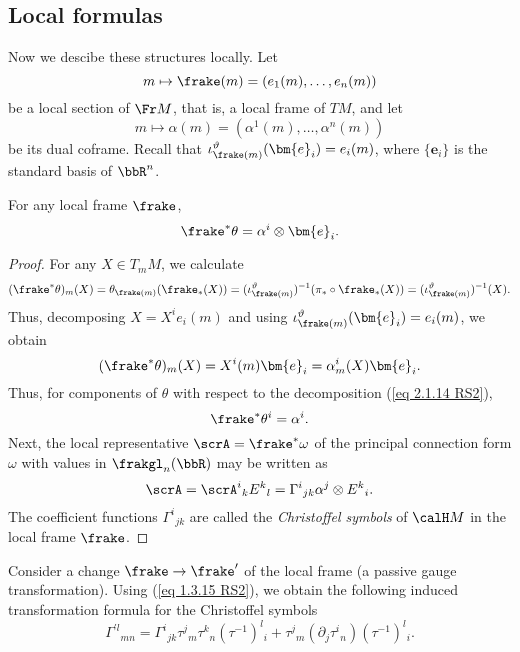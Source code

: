 \subsection{Local formulas}


Now we descibe these structures locally. Let
\[m\mapsto \frake(m)=(e_1(m),\ldots,e_n(m))\]
be a local section of $\Fr M$, that is, a local frame of $TM$, and let 
\[m\mapsto \alpha(m)=(\alpha^1(m),\ldots,\alpha^n(m))\]
be its dual coframe. Recall that $\iota^\vartheta_{\frake(m)}(\bm{e}_i)=e_i(m)$, where $\{\bm{e}_i\}$ is the standard basis of $\bbR^n$.

\begin{lem}[{{\cite[Lem.~2.1.26]{RS2}}}]\label{lem 2.1.26 RS2}
    For any local frame $\frake$,
    \[\frake^\ast \theta=\alpha^i\otimes\bm{e}_i.\]
\end{lem}
\begin{proof}
    For any $X\in T_mM$, we calculate 
    \[(\frake^\ast \theta)_m(X)=\theta_{\frake(m)}(\frake_\ast(X))=(\iota^\vartheta_{\frake(m)})^{-1}(\pi_\ast\circ\frake_\ast(X))=(\iota^\vartheta_{\frake(m)})^{-1}(X).\]
    Thus, decomposing $X=X^ie_i(m)$ and using $\iota^\vartheta_{\frake(m)}(\bm{e}_i)=e_i(m)$, we obtain
    \[(\frake^\ast\theta)_m(X)=X^i(m)\bm{e}_i=\alpha^i_m(X)\bm{e}_i.\]
    Thus, for components of $\theta$ with respect to the decomposition (\ref{eq 2.1.14 RS2}),
    \[\frake^\ast \theta^i=\alpha^i.\]
    Next, the local representative $\scrA=\frake^\ast\omega$ of the principal connection form $\omega$ with values in $\frakgl_n(\bbR)$ may be written as 
    \[\scrA=\scrA^i{}_k E^k{}_l=\Gamma^i{}_{jk}\alpha^j\otimes E^k{}_i.\label{eq 2.1.39 RS2}\]
    The coefficient functions $\Gamma^i{}_{jk}$ are called the \emph{Christoffel symbols} of $\calH M$ in the local frame $\frake$.
\end{proof}

\begin{rem}
    Consider a change $\frake\to \frake'$ of the local frame (a passive gauge transformation). Using (\ref{eq 1.3.15 RS2}), we obtain the following induced transformation formula for the Christoffel symbols 
    \[\Gamma^{\prime l}{}_{mn}=\Gamma^i{}_{jk}\tau^j{}_m \tau^k{}_n(\tau^{-1})^l{}_i+\tau^j{}_m(\partial_j \tau^i{}_n)(\tau^{-1})^l{}_i.\label{eq 2.1.40 RS2}\]
\end{rem}

